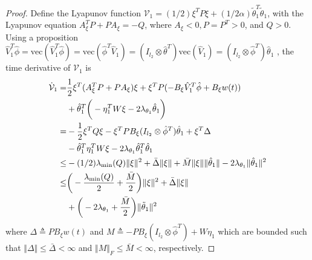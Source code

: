\begin{proof}
Define the Lyapunov function $\mathcal V_1=(1/2)\xi^TP\xi+(1/2\alpha)\tilde\theta_1^T\tilde\theta_1$, with the Lyapunov equation $A_\xi^TP+PA_\xi=-Q$, where $A_\xi<0,P=P^T>0$, and $Q>0$.
Using a proposition $\hat V_1^T\hat\phi = \text{vec}(\hat V_1^T\hat\phi)=\text{vec}(\hat\phi^T\hat V_1) = (I_{l_2}\otimes \hat\theta^T)\text{vec}(\hat V_1)=(I_{l_2}\otimes \hat\phi^T)\hat\theta_1$ \cite[Proposition~(7.1.9)]{RN22}, the time derivative of $\mathcal V_1$ is
\begin{equation}
    \begin{aligned}
        \dot {\mathcal V}_1 =& {1\over 2}\xi^T(A_\xi^TP+PA_\xi)\xi+\xi ^TP ( -B_\xi\hat V_1^T\hat \phi   +B_\xi w(t) )\\
        &+\hat\theta_1^T
        \bigg(
            -\eta_1^TW \xi-2\lambda_{\theta_1} \hat\theta_1 
        \bigg)
        \\
        =& -{1\over 2}\xi^TQ\xi -\xi^TPB_\xi(I_{l_2}\otimes \hat\phi^T)\hat\theta_1 +\xi^T\Delta
        \\
        &
        -\hat\theta_1^T\eta_1^TW\xi
        -2\lambda_{\theta_1} \hat\theta_1^T\hat\theta_1
        \\
        \le& -(1/2)\lambda_\text{min}(Q)\Vert \xi\Vert ^2
        +\bar\Delta \Vert \xi\Vert  
        +\bar M\Vert \xi\Vert  \Vert \hat\theta_1\Vert
        -2\lambda_{\theta_1}
        \Vert\hat\theta_1\Vert ^2
        \\
        \le& 
        \bigg(
        -{\lambda_\text{min}(Q)\over 2} +{\bar M\over 2}
        \bigg)
        \Vert \xi\Vert ^2 +\bar\Delta \Vert \xi\Vert  
        \\
        &+ 
        \bigg(
        -2\lambda_{\theta_1} 
        +{\bar M\over 2}
        \bigg)
        \Vert \tilde\theta_1\Vert ^2 
        \end{aligned}
        \label{chap3:eq:V1_dot}
\end{equation}
where $\Delta\triangleq PB_\xi w(t)$ and $M\triangleq  -PB_\xi(I_{l_2}\otimes \hat\phi^T)+W\eta_1$ which are bounded such that $\Vert\Delta\Vert\le\bar\Delta<\infty$ and $\Vert M\Vert_F\le \bar M< \infty$, respectively.


\end{proof}
